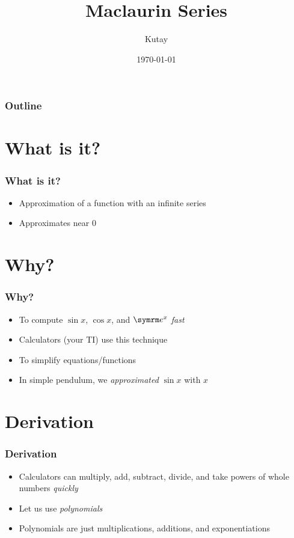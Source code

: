 \documentclass{beamer}
\title{Maclaurin Series}
\author{Kutay}
\institute{Made with LaTeX}
\date{\today}
\begin{document}
\begin{frame}
  \titlepage
\end{frame}

\begin{frame}
  \frametitle{Outline}
  \tableofcontents
\end{frame}

\section{What is it?}

\begin{frame}
  \frametitle{What is it?}
  \begin{itemize}
    \item Approximation of a function with an infinite series
    \item Approximates near 0
  \end{itemize}
\end{frame}

\section{Why?}

\begin{frame}
  \frametitle{Why?}
  \begin{itemize}
    \item To compute \( \sin x \), \( \cos x \), and \( \e^x \) \textit{fast}
    \item Calculators (your TI) use this technique
    \item To simplify equations/functions
    \item In simple pendulum, we \textit{approximated} \( \sin x \) with \( x \)
  \end{itemize}
\end{frame}

\section{Derivation}

\begin{frame}
  \frametitle{Derivation}
  \begin{itemize}
    \item Calculators can multiply, add, subtract, divide, and take powers of whole numbers \textit{quickly}
    \item Let us use \textit{polynomials}
    \item Polynomials are just multiplications, additions, and exponentiations
  \end{itemize}
\end{frame}
\end{document}
